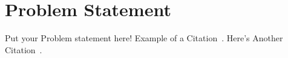 \section*{Problem Statement}
Put your Problem statement here! Example of a Citation~\cite[p.219]{weiss2015write}. Here's Another Citation~\cite{staub1920write}.
